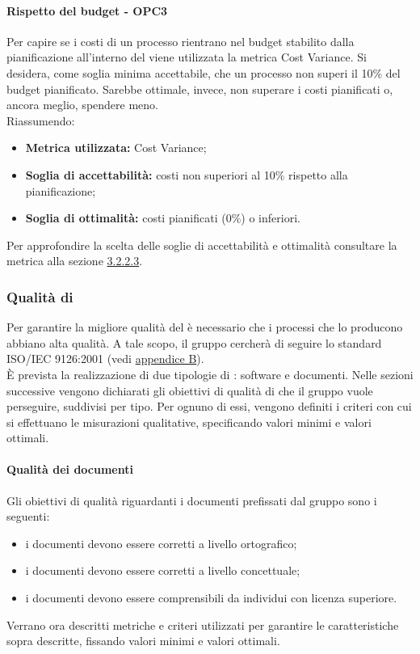 \documentclass[PianoDiQualifica.tex]{subfiles}
\begin{document}
			\paragraph{Rispetto del budget - OPC3}
			Per capire se i costi di un processo rientrano nel budget stabilito dalla pianificazione all'interno del \PPdocRR{} viene utilizzata la metrica Cost Variance.
			Si desidera, come soglia minima accettabile, che un processo non superi il 10\% del budget pianificato. Sarebbe ottimale, invece, non superare i costi pianificati o, ancora meglio,
			spendere meno.\\
			Riassumendo:
			\begin{itemize}
			\item \textbf{Metrica utilizzata:} Cost Variance;
			\item \textbf{Soglia di accettabilità:} costi non superiori al 10\% rispetto alla pianificazione;
			\item \textbf{Soglia di ottimalità:}  costi pianificati (0\%) o inferiori.
			\end{itemize}
			Per approfondire la scelta delle soglie di accettabilità e ottimalità consultare la metrica alla sezione \hyperlink{Cost_m}{3.2.2.3}.

		\subsubsection{Qualità di }
		Per garantire la migliore qualità del  è necessario che i processi che lo producono abbiano alta qualità.
		A tale scopo, il gruppo \GRUPPO{} cercherà di seguire lo standard ISO/IEC 9126:2001 (vedi \hyperlink{ISOIEC}{appendice B}). \\
		È prevista la realizzazione di due tipologie di : software e documenti.
		Nelle sezioni successive vengono dichiarati gli obiettivi di qualità di  che il gruppo vuole perseguire, suddivisi per tipo.
		Per ognuno di essi, vengono definiti i criteri con cui si effettuano le misurazioni qualitative, specificando valori minimi e valori ottimali.

			\paragraph{Qualità dei documenti}
			Gli obiettivi di qualità riguardanti i documenti prefissati dal gruppo \GRUPPO{} sono i seguenti:
			\begin{itemize}
				\item i documenti devono essere corretti a livello ortografico;
				\item i documenti devono essere corretti a livello concettuale;
				\item i documenti devono essere comprensibili da individui con licenza superiore.
			\end{itemize}
			Verrano ora descritti metriche e criteri utilizzati per garantire le caratteristiche sopra descritte, fissando valori minimi e valori ottimali.
\end{document}
